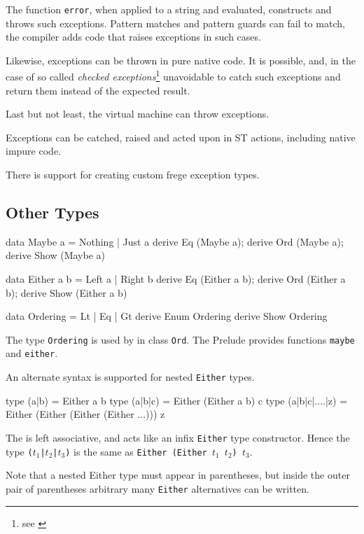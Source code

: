 The function \texttt{error}, when applied to a string and evaluated, 
constructs and throws such exceptions. Pattern matches and pattern guards
can fail to match, the compiler adds code that raises exceptions in such cases.

Likewise, exceptions can be thrown in pure native code. 
It is possible, and, in the case of so called 
\emph{checked exceptions}\footnote{see \cite[§11.2]{langspec3}}
unavoidable to catch such exceptions and return them instead of the expected result.

Last but not least, the \java{} virtual machine can throw exceptions. 

Exceptions can be catched, raised and acted upon in ST actions,
including native impure code. 

There is support for creating custom frege exception types. 


\subsection{Other Types}

\begin{code}
data Maybe a = Nothing | Just a
derive Eq (Maybe a); derive Ord (Maybe a); derive Show (Maybe a)

data Either a b = Left a | Right b
derive Eq (Either a b); derive Ord (Either a b);
derive Show (Either a b)

data Ordering = Lt | Eq | Gt
derive Enum Ordering
derive Show Ordering
\end{code}

The type \texttt{Ordering} is used by \sym{(<=>)} in class \texttt{Ord}.
The Prelude provides functions \texttt{maybe} and \texttt{either}.

An alternate syntax is supported for nested \texttt{Either} types. \label{nested-either}

\begin{code}
type (a|b) = Either a b
type (a|b|c) = Either (Either a b) c
type (a|b|c|....|z) = Either (Either (Either (Either ...))) z
\end{code}

The \sym{|} is left associative, and acts like an infix \texttt{Either} type constructor.
Hence the type 
\texttt{($t_1$|$t_2$|$t_3$)} is the same as 
\texttt{Either (Either $t_1$ $t_2$) $t_3$}.

Note that a nested Either type must appear in parentheses, 
but inside the outer pair of parentheses arbitrary many \texttt{Either} alternatives can be written.

